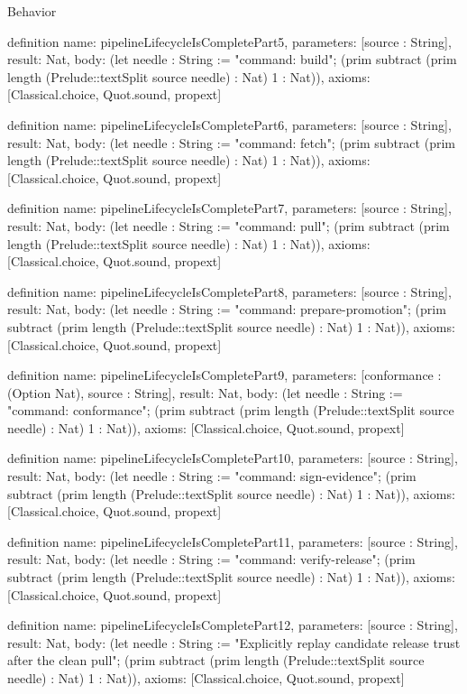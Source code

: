 \begin{lexlean}{Behavior}
\begin{semanticmodule}
definition{
  name: pipelineLifecycleIsCompletePart5,
  parameters: [source : String],
  result: Nat,
  body: (let needle : String := "command: build"; (prim subtract (prim length (Prelude::textSplit source needle) : Nat) 1 : Nat)),
  axioms: [Classical.choice, Quot.sound, propext]
}

definition{
  name: pipelineLifecycleIsCompletePart6,
  parameters: [source : String],
  result: Nat,
  body: (let needle : String := "command: fetch"; (prim subtract (prim length (Prelude::textSplit source needle) : Nat) 1 : Nat)),
  axioms: [Classical.choice, Quot.sound, propext]
}

definition{
  name: pipelineLifecycleIsCompletePart7,
  parameters: [source : String],
  result: Nat,
  body: (let needle : String := "command: pull"; (prim subtract (prim length (Prelude::textSplit source needle) : Nat) 1 : Nat)),
  axioms: [Classical.choice, Quot.sound, propext]
}

definition{
  name: pipelineLifecycleIsCompletePart8,
  parameters: [source : String],
  result: Nat,
  body: (let needle : String := "command: prepare-promotion"; (prim subtract (prim length (Prelude::textSplit source needle) : Nat) 1 : Nat)),
  axioms: [Classical.choice, Quot.sound, propext]
}

definition{
  name: pipelineLifecycleIsCompletePart9,
  parameters: [conformance : (Option Nat), source : String],
  result: Nat,
  body: (let needle : String := "command: conformance"; (prim subtract (prim length (Prelude::textSplit source needle) : Nat) 1 : Nat)),
  axioms: [Classical.choice, Quot.sound, propext]
}

definition{
  name: pipelineLifecycleIsCompletePart10,
  parameters: [source : String],
  result: Nat,
  body: (let needle : String := "command: sign-evidence"; (prim subtract (prim length (Prelude::textSplit source needle) : Nat) 1 : Nat)),
  axioms: [Classical.choice, Quot.sound, propext]
}

definition{
  name: pipelineLifecycleIsCompletePart11,
  parameters: [source : String],
  result: Nat,
  body: (let needle : String := "command: verify-release"; (prim subtract (prim length (Prelude::textSplit source needle) : Nat) 1 : Nat)),
  axioms: [Classical.choice, Quot.sound, propext]
}

definition{
  name: pipelineLifecycleIsCompletePart12,
  parameters: [source : String],
  result: Nat,
  body: (let needle : String := "Explicitly replay candidate release trust after the clean pull"; (prim subtract (prim length (Prelude::textSplit source needle) : Nat) 1 : Nat)),
  axioms: [Classical.choice, Quot.sound, propext]
}


\end{semanticmodule}
\end{lexlean}
